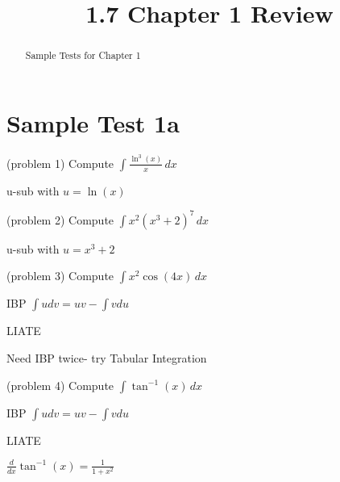 \documentclass[handout]{ximera}
\title{1.7 Chapter 1 Review}
\begin{document}
\begin{abstract}
Sample Tests for Chapter 1
\end{abstract}

\maketitle

\section{Sample Test 1a}

\begin{problem}(problem 1)
Compute $\displaystyle \int \frac{\ln^3(x)}{x} \, dx$ 

\begin{hint}
u-sub with $u = \ln(x)$
\end{hint}

\end{problem}


\begin{problem}(problem 2)
Compute $\displaystyle \int x^2(x^3 + 2)^7 \, dx$

\begin{hint}
u-sub with $u = x^3 + 2$
\end{hint}

\end{problem}

\begin{problem}(problem 3)
Compute $\displaystyle \int x^2\cos(4x) \, dx$

\begin{hint}
IBP $\int u dv = uv - \int v du$
\end{hint}

\begin{hint}
LIATE
\end{hint}

\begin{hint}
Need IBP twice- try Tabular Integration
\end{hint}

\end{problem}


\begin{problem}(problem 4)
Compute $\displaystyle \int \tan^{-1}(x) \, dx$

\begin{hint}
IBP $\int u dv = uv - \int v du$
\end{hint}

\begin{hint}
LIATE
\end{hint}

\begin{hint}
$\displaystyle \frac{d}{dx} \tan^{-1} (x) = \frac{1}{1+x^2}$
\end{hint}


\end{problem}
\end{document}
